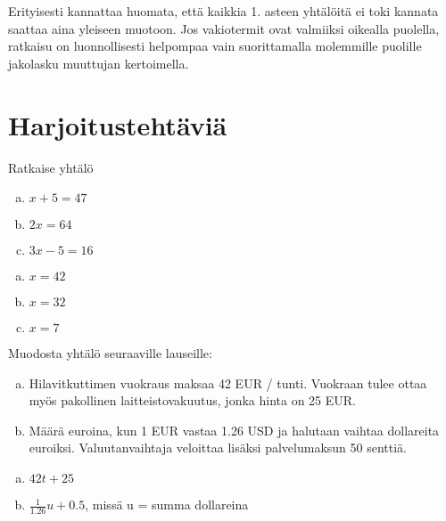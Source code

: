 Erityisesti kannattaa huomata, että kaikkia 1. asteen yhtälöitä ei toki
kannata saattaa aina yleiseen muotoon. Jos vakiotermit ovat valmiiksi oikealla
puolella, ratkaisu on luonnollisesti helpompaa vain suorittamalla
molemmille puolille jakolasku muuttujan kertoimella.

\section{Harjoitustehtäviä}

\begin{tehtava}
  Ratkaise yhtälö
  \begin{enumerate}[a)]
    \item $x + 5 = 47$
    \item $2x = 64$
    \item $3x - 5 = 16$
  \end{enumerate}

  \begin{vastaus}
    \begin{enumerate}[a)]
      \item $x = 42$
      \item $x = 32$
      \item $x = 7$
    \end{enumerate}
  \end{vastaus}
\end{tehtava}

\begin{tehtava}
  Muodosta yhtälö seuraaville lauseille:
  \begin{enumerate}[a)]
    \item Hilavitkuttimen vuokraus maksaa 42 EUR / tunti. Vuokraan tulee ottaa myös pakollinen laitteistovakuutus, jonka hinta on 25 EUR.
    \item Määrä euroina, kun 1 EUR vastaa 1.26 USD ja halutaan vaihtaa dollareita euroiksi. Valuutanvaihtaja veloittaa lisäksi palvelumaksun 50 senttiä.
  \end{enumerate}

  \begin{vastaus}
    \begin{enumerate}[a)]
      \item $42t + 25$
      \item $\frac{1}{1.26}u + 0.5$, missä u = summa dollareina
    \end{enumerate}
  \end{vastaus}
\end{tehtava}
